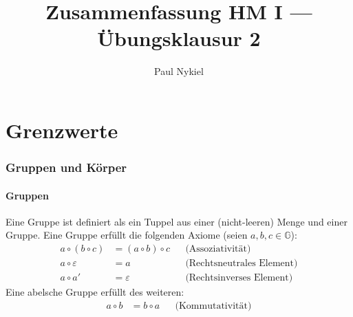 \documentclass[10pt]{article}
\title{Zusammenfassung HM I --- Übungsklausur 2}
\author{Paul Nykiel}
\begin{document}
    \maketitle
    \pagebreak
    \tableofcontents
    \pagebreak

    \part{Grenzwerte}
    \section{Gruppen und Körper}
    \subsection{Gruppen}
    Eine Gruppe ist definiert als ein Tuppel aus einer (nicht-leeren) Menge
    und einer Gruppe.
    Eine Gruppe erfüllt die folgenden Axiome (seien $a,b,c \in \mathbb{G}$):
    \begin{align*}
        a \circ (b \circ c) &= (a \circ b) \circ c &&\text{(Assoziativität)}\\
        a \circ \varepsilon &= a &&\text{(Rechtsneutrales Element)}\\
        a \circ a' &= \varepsilon  &&\text{(Rechtsinverses Element)}
    \end{align*}
    Eine abelsche Gruppe erfüllt des weiteren:
    \begin{align*}
        a \circ b &= b \circ a  &&\text{(Kommutativität)}
    \end{align*}
\end{document}
